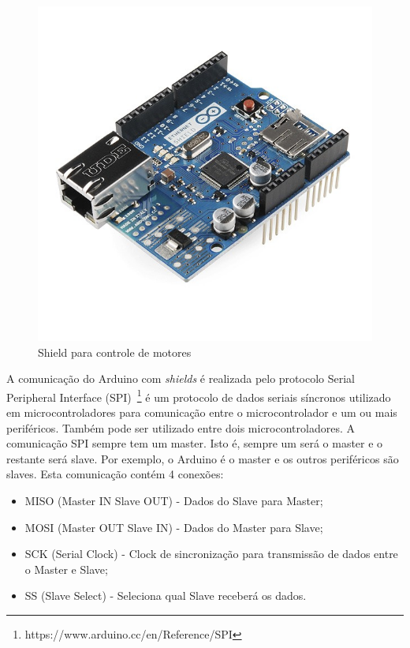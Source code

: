 \begin{figure}[ht]
      \centering
      \includegraphics[scale=0.35]{figuras/image_321.jpg}
      \caption{Shield para controle de motores}
      \label{fig:motorControl}
\end{figure}

A comunicação do Arduino com \textit{shields} é realizada pelo protocolo Serial Peripheral Interface (SPI)~\footnote{https://www.arduino.cc/en/Reference/SPI
}  é um protocolo de dados seriais síncronos utilizado em microcontroladores para comunicação entre o microcontrolador e um ou mais periféricos. Também pode ser utilizado entre dois microcontroladores.
A comunicação SPI sempre tem um master. Isto é, sempre um será o master e o restante será slave. Por exemplo, o Arduino é o master e os outros periféricos são slaves. Esta comunicação contém 4 conexões:

\begin{itemize}
  \item MISO (Master IN Slave OUT) - Dados do Slave para Master;
  \item MOSI (Master OUT Slave IN) - Dados do Master para Slave;
  \item SCK (Serial Clock) - Clock de sincronização para transmissão de dados entre o Master e Slave;
  \item SS (Slave Select) - Seleciona qual Slave receberá os dados.
\end{itemize}

